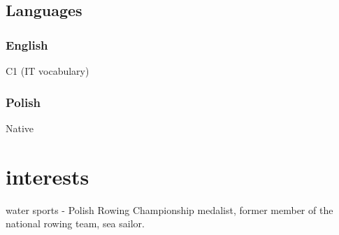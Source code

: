 \documentclass{article}
\begin{document}
\begin{minipage}[t]{.4\textwidth}
	\subsection{Languages}
	\subsubsection{English} C1 (IT vocabulary)
    \subsubsection{Polish} Native

	\vspace{1em}

	\section{interests}
    water sports - Polish Rowing Championship medalist, former member of the national rowing team, sea sailor.

\end{minipage}
\end{document}
